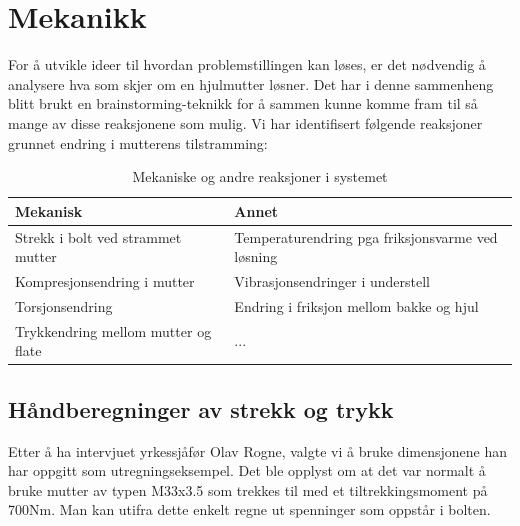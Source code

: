 \section{Mekanikk}

For å utvikle ideer til hvordan problemstillingen kan løses, er det nødvendig å analysere hva som skjer om en hjulmutter løsner. Det har i denne sammenheng blitt brukt en brainstorming-teknikk for å sammen kunne komme fram til så mange av disse reaksjonene som mulig. Vi har identifisert følgende reaksjoner grunnet endring i mutterens tilstramming:

\begin{table}[h]
\caption{Mekaniske og andre reaksjoner i systemet}
\begin{tabular}{|l|l|}
\hline
\textbf{Mekanisk}                   & \textbf{Annet}                                   \\
\hline
Strekk i bolt ved strammet mutter   & Temperaturendring pga friksjonsvarme ved løsning \\
\hline
Kompresjonsendring i mutter         & Vibrasjonsendringer i understell                 \\
\hline
Torsjonsendring                     & Endring i friksjon mellom bakke og hjul          \\
\hline
Trykkendring mellom mutter og flate & ...                                              \\
\hline
\end{tabular}
\end{table}

\subsection{Håndberegninger av strekk og trykk}

Etter å ha intervjuet yrkessjåfør Olav Rogne, valgte vi å bruke dimensjonene han har oppgitt som utregningseksempel. Det ble opplyst om at det var normalt å bruke mutter av typen M33x3.5 som trekkes til med et tiltrekkingsmoment på 700Nm. Man kan utifra dette enkelt regne ut spenninger som oppstår i bolten.

